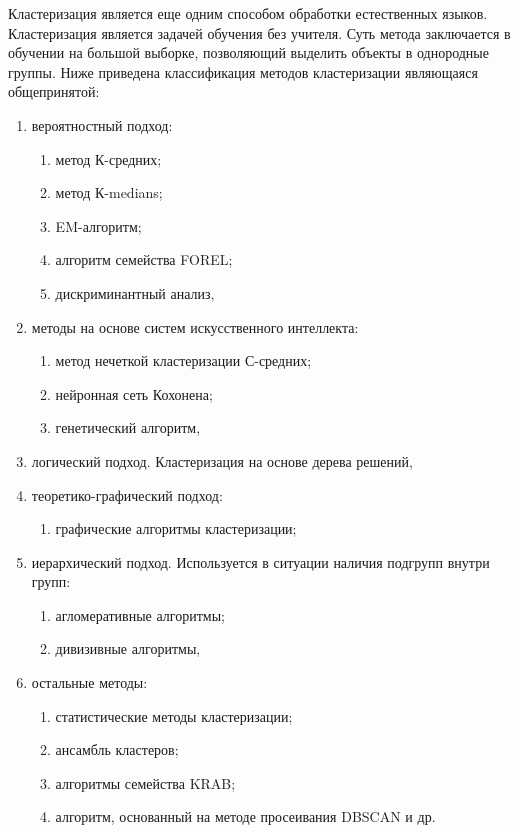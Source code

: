 \documentclass{standalone}
\begin{document}
\par Кластеризация является еще одним способом обработки естественных языков. Кластеризация является задачей обучения без учителя. Суть метода заключается в обучении на большой выборке, позволяющий выделить объекты в однородные группы. Ниже приведена классификация методов кластеризации являющаяся общепринятой:
\begin{enumerate}
    \item вероятностный подход:
        \begin{enumerate}
            \item метод К-средних;
            \item метод К-medians;
            \item EM-алгоритм;
            \item алгоритм семейства FOREL;
            \item дискриминантный анализ,
        \end{enumerate}
    \item методы на основе систем искусственного интеллекта:
        \begin{enumerate}
            \item метод нечеткой кластеризации С-средних;
            \item нейронная сеть Кохонена;
            \item генетический алгоритм,
        \end{enumerate}
    \item логический подход. Кластеризация на основе дерева решений,
    \item теоретико-графический подход:
        \begin{enumerate}
            \item графические алгоритмы кластеризации;
        \end{enumerate}
    \item иерархический подход. Используется в ситуации наличия подгрупп внутри групп:
        \begin{enumerate}
            \item агломеративные алгоритмы;
            \item дивизивные алгоритмы,
        \end{enumerate}
    \item остальные методы:
        \begin{enumerate}
            \item статистические методы кластеризации;
            \item ансамбль кластеров;
            \item алгоритмы семейства KRAB;
            \item алгоритм, основанный на методе просеивания DBSCAN и др.
        \end{enumerate}
\end{enumerate}
\end{document}
